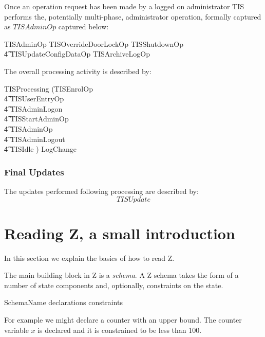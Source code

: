 Once an operation request has been made by a logged on administrator
TIS performs the, potentially multi-phase, administrator operation,
formally captured as $TISAdminOp$ captured below:

\begin{zed}
        TISAdminOp  TISOverrideDoorLockOp  \lor TISShutdownOp 
\\      \t4     \lor TISUpdateConfigDataOp \lor TISArchiveLogOp
\end{zed}

The overall processing activity is described by:

\begin{zed}
        TISProcessing  (TISEnrolOp
\\ \t4  \lor TISUserEntryOp
\\ \t4  \lor TISAdminLogon 
\\ \t4  \lor TISStartAdminOp
\\ \t4  \lor TISAdminOp 
\\ \t4  \lor TISAdminLogout
\\ \t4  \lor TISIdle ) \land LogChange
\end{zed}

\subsection{Final Updates}
The updates performed following processing are described by:
\[
        TISUpdate
\]


\chapter{Reading Z, a small introduction}
\label{chap:readZ}
In this section we explain the basics of how to read Z. 

The main building block in Z is a {\em schema}. 
A Z schema takes the form of a number of state components and,
optionally, constraints on the state.

\begin{lateschema}{SchemaName}
        declarations
\where
        constraints
\end{lateschema} 

For example we might declare a counter with an upper bound. The
counter variable $x$ is declared and it is constrained
to be less than 100.

